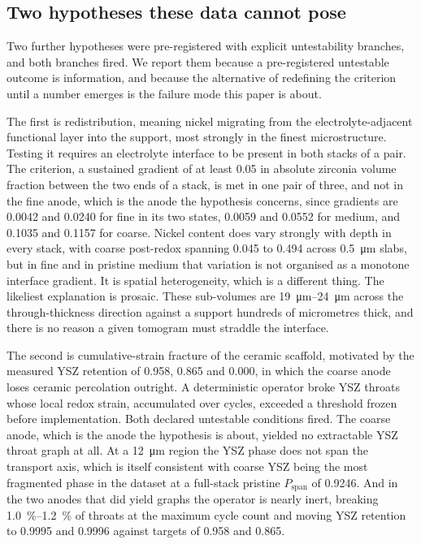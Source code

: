 \documentclass[5p,times,twocolumn]{elsarticle}
\newcommand{\Pspan}{P_{\mathrm{span}}}
\begin{document}
\subsection{Two hypotheses these data cannot pose}

Two further hypotheses were pre-registered with explicit untestability
branches, and both branches fired. We report them because a pre-registered
untestable outcome is information, and because the alternative of redefining
the criterion until a number emerges is the failure mode this paper is
about.

The first is redistribution, meaning nickel migrating from the
electrolyte-adjacent
functional layer into the support, most strongly in the finest microstructure.
Testing it requires an electrolyte interface to be present in both stacks of a
pair. The criterion, a sustained gradient of at least 0.05 in absolute
zirconia volume fraction between the two ends of a stack, is met in one pair
of three, and not in the fine anode, which is the anode the hypothesis
concerns, since gradients are 0.0042 and 0.0240 for fine in its two states,
0.0059
and 0.0552 for medium, and 0.1035 and 0.1157 for coarse. Nickel content does
vary strongly with depth in every stack, with coarse post-redox spanning 0.045 to
0.494 across \SI{0.5}{\micro\metre} slabs, but in fine and in pristine medium
that variation is not organised as a monotone interface gradient. It is
spatial heterogeneity, which is a different thing. The likeliest explanation
is prosaic. These sub-volumes are \SIrange{19}{24}{\micro\metre} across the
through-thickness direction against a support hundreds of micrometres thick,
and there is no reason a given tomogram must straddle the interface.

The second is cumulative-strain fracture of the ceramic scaffold, motivated by
the measured YSZ retention of 0.958, 0.865 and 0.000, in which the coarse
anode loses ceramic percolation outright. A deterministic operator broke YSZ
throats whose local redox strain, accumulated over cycles, exceeded a
threshold frozen before implementation. Both declared untestable conditions
fired. The coarse anode, which is the anode the hypothesis is about, yielded
no extractable YSZ throat graph at all. At a \SI{12}{\micro\metre} region the
YSZ phase does not span the transport axis, which is itself consistent with
coarse YSZ being the most fragmented phase in the dataset at a full-stack
pristine $\Pspan$ of 0.9246. And in the two anodes that did yield graphs the
operator is nearly inert, breaking \SIrange{1.0}{1.2}{\percent} of throats at
the maximum cycle count and moving YSZ retention to 0.9995 and 0.9996 against
targets of 0.958 and 0.865.
\end{document}
